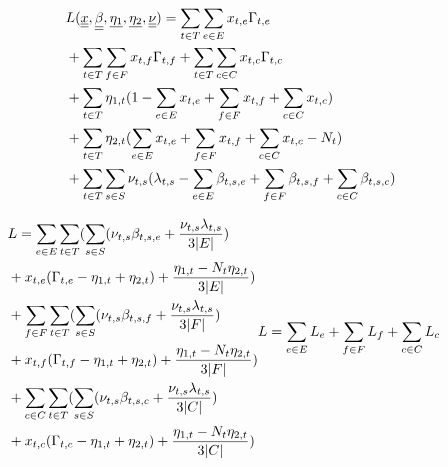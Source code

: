 \documentclass[conference]{IEEEtran}
\begin{document}
    \begin{subequations}
      \begin{align}
        & \notag L(\underline{\underline x}, \underline{\underline \beta}, \underline {\eta_1}, \underline {\eta_2}, \underline{\underline \nu}) = \sum_{t \in T}\sum_{e \in E} x_{t,e}\Gamma_{t,e} \\
        & \notag + \sum_{t \in T}\sum_{f \in F} x_{t,f}\Gamma_{t,f} + \sum_{t \in T}\sum_{c \in C} x_{t,c}\Gamma_{t,c} \\
        & \notag + \sum_{t \in T  }{\eta_{1,t}(1-\sum_{e \in E}x_{t,e} + \sum_{f \in F}x_{t,f} + \sum_{c \in C}x_{t,c})} \\
        & \notag + \sum_{t \in T}{\eta_{2,t}(\sum_{e \in E}x_{t,e} + \sum_{f \in F}x_{t,f} + \sum_{c \in C}x_{t,c}-N_t)} \\
        & + \sum_{t \in T}\sum_{s \in S}{\nu_{t,s}(\lambda_{t,s} - \sum_{e \in E}\beta_{t,s,e} + \sum_{f \in F}\beta_{t,s,f} +\sum_{c \in C}\beta_{t,s,c})}
      \end{align}
    \end{subequations}

    \begin{subequations}
      \begin{align}
      & \notag L = \sum_{e \in E}\sum_{t \in T}(\sum_{s \in S}(\nu_{t,s}\beta_{t,s,e}+\frac{\nu_{t,s}\lambda_{t,s}}{3|E|}) \\
      &\notag + x_{t,e}(\Gamma_{t,e}-\eta_{1,t}+\eta_{2,t})+\frac{\eta_{1,t}-N_t\eta_{2,t}}{3|E|}) \\
      & \notag + \sum_{f \in F}\sum_{t \in T}(\sum_{s \in S}(\nu_{t,s}\beta_{t,s,f}+\frac{\nu_{t,s}\lambda_{t,s}}{3|F|}) \\
      & \notag + x_{t,f}(\Gamma_{t,f}-\eta_{1,t}+\eta_{2,t})+\frac{\eta_{1,t}-N_t\eta_{2,t}}{3|F|}) \\
      & \notag + \sum_{c \in C}\sum_{t \in T}(\sum_{s \in S}(\nu_{t,s}\beta_{t,s,c}+\frac{\nu_{t,s}\lambda_{t,s}}{3|C|}) \\
      &+ x_{t,c}(\Gamma_{t,c}-\eta_{1,t}+\eta_{2,t})+\frac{\eta_{1,t}-N_t\eta_{2,t}}{3|C|})
      \end{align}
      \begin{align}
      & L = \sum_{e \in E}L_e + \sum_{f \in F}L_f + \sum_{c \in C}L_c
      \end{align}
    \end{subequations}
\end{document}
